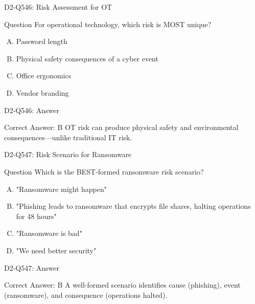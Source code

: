 \documentclass{beamer}
\begin{document}
	\begin{frame}{D2-Q546: Risk Assessment for OT}
		\begin{block}{Question}
			For operational technology, which risk is MOST unique?
		\end{block}
		\begin{enumerate}[(A)]
			\item Password length
			\item Physical safety consequences of a cyber event
			\item Office ergonomics
			\item Vendor branding
		\end{enumerate}
	\end{frame}
	\begin{frame}{D2-Q546: Answer}
		\begin{block}{Correct Answer: B}
			OT risk can produce physical safety and environmental consequences—unlike traditional IT risk.
		\end{block}
	\end{frame}
	
	\begin{frame}{D2-Q547: Risk Scenario for Ransomware}
		\begin{block}{Question}
			Which is the BEST-formed ransomware risk scenario?
		\end{block}
		\begin{enumerate}[(A)]
			\item "Ransomware might happen"
			\item "Phishing leads to ransomware that encrypts file shares, halting operations for 48 hours"
			\item "Ransomware is bad"
			\item "We need better security"
		\end{enumerate}
	\end{frame}
	\begin{frame}{D2-Q547: Answer}
		\begin{block}{Correct Answer: B}
			A well-formed scenario identifies cause (phishing), event (ransomware), and consequence (operations halted).
		\end{block}
	\end{frame}
	
\end{document}

